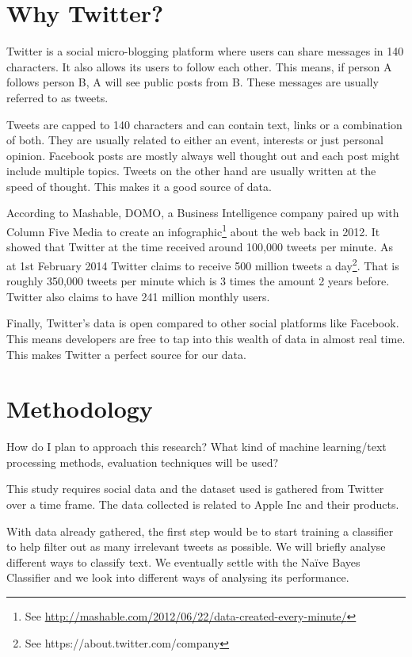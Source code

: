 \section{Why Twitter?}
\label{sec:why_twitter}
Twitter is a social micro-blogging platform where users can share messages in 140 characters. It
also allows its users to follow each other. This means, if person A follows person B, A will see
public posts from B. These messages are usually referred to as tweets.

Tweets are capped to 140 characters and can contain text, links or a combination of both. They are
usually related to either an event, interests or just personal opinion. Facebook posts are mostly
always well thought out and each post might include multiple topics. Tweets on the other hand are
usually written at the speed of thought. This makes it a good source of data.

According to Mashable, DOMO, a Business Intelligence company paired up with Column Five Media to
create an infographic\footnote{See \url{http://mashable.com/2012/06/22/data-created-every-minute/}}
about the web back in 2012. It showed that Twitter at the time received around 100,000 tweets per
minute. As at 1st February 2014 Twitter claims to receive 500 million tweets a day\footnote{See
https://about.twitter.com/company}. That is roughly 350,000 tweets per minute which is 3 times the
amount 2 years before. Twitter also claims to have 241 million monthly users.

Finally, Twitter's data is open compared to other social platforms like Facebook. This means
developers are free to tap into this wealth of data in almost real time. This makes Twitter a
perfect source for our data.


\section{Methodology}
\label{sec:methodology}
How do I plan to approach this research? What kind of machine learning/text processing methods,
evaluation techniques will be used?

This study requires social data and the dataset used is gathered from Twitter over a time frame.
The data collected is related to Apple Inc and their products.

With data already gathered, the first step would be to start training a classifier to help filter
out as many irrelevant tweets as possible. We will briefly analyse different ways to classify text.
We eventually settle with the Na\"{i}ve Bayes Classifier and we look into different ways of analysing
its performance.

